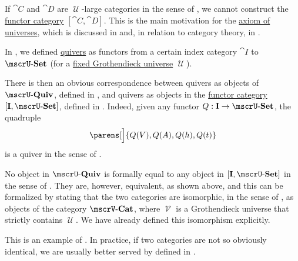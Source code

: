 \begin{remark}\label{rem:functor_category_size}
  If \( \cat{C} \) and \( \cat{D} \) are \( \mscrU \)-large categories in the sense of , we cannot construct the \hyperref[def:functor_category]{functor category} \( [\cat{C}, \cat{D}] \). This is the main motivation for the \hyperref[def:axiom_of_universes]{axiom of universes}, which is discussed in  and, in relation to category theory, in .
\end{remark}

\begin{example}\label{ex:isomorphism_of_quiver_categories}
  In , we defined \hyperref[def:quiver]{quivers} as functors from a certain index category \( \cat{I} \) to \( \ucat{Set} \) (for a \hyperref[def:category_size]{fixed Grothendieck universe} \( \mscrU \)).

  There is then an obvious correspondence between quivers as objects of \hyperref[def:category_of_small_quivers]{\( \ucat{Quiv} \)}, defined in , and quivers as objects in the \hyperref[def:functor_category]{functor category} \( [\cat{I}, \ucat{Set}] \), defined in . Indeed, given any functor \( Q: \cat{I} \to \ucat{Set} \), the quadruple
  \begin{equation*}
    \parens[\Big]{ Q(V), Q(A), Q(h), Q(t) }
  \end{equation*}
  is a quiver in the sense of .

  No object in \( \ucat{Quiv} \) is formally equal to any object in \( [\cat{I}, \ucat{Set}] \) in the sense of \hyperref[def:zfc]{}. They are, however, equivalent, as shown above, and this can be formalized by stating that the two categories are isomorphic, in the sense of , as objects of the category \( \ucat[\mscrV]{Cat} \), where \( \mscrV \) is a Grothendieck universe that strictly contains \( \mscrU \). We have already defined this isomorphism explicitly.

  This is an example of . In practice, if two categories are not so obviously identical, we are usually better served by  defined in .
\end{example}

